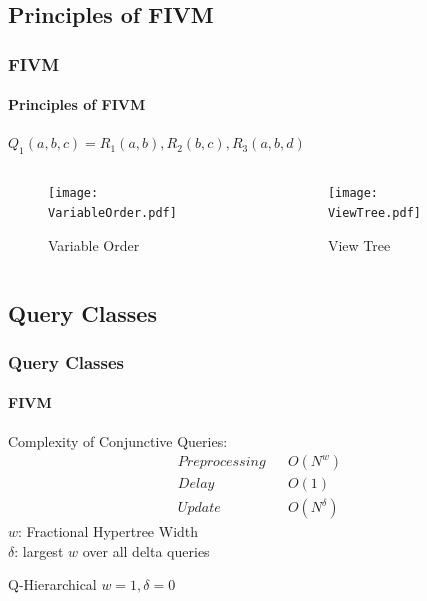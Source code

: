 \documentclass[
	11pt, %
]{beamer}
\begin{document}

\subsection{Principles  of FIVM}
\begin{frame}
		\frametitle{FIVM}
		\framesubtitle{Principles of FIVM}


		$Q_1(a, b, c) = R_1(a, b), R_2(b, c), R_3(a, b, d)$
		\begin{columns}[c] 
			\begin{column}{0.45\textwidth} 
				\begin{figure}
					\texttt{[image: VariableOrder.pdf]}
					\caption{Variable Order}
				\end{figure}
			\end{column}
			\begin{column}{0.45\textwidth} 
				\begin{figure}
					\texttt{[image: ViewTree.pdf]}
					\caption{View Tree}
				\end{figure}
			\end{column}
		\end{columns}

\end{frame}
\subsection{Query Classes}
\begin{frame}
	\frametitle{Query Classes}
	\framesubtitle{FIVM}
	Complexity of Conjunctive Queries:
	\begin{align*}
		Preprocessing & & O(N^w) \\
		Delay & & O(1) \\
		Update & & O(N^\delta)
	\end{align*}
	$w$: Fractional Hypertree Width\\
	$\delta$: largest $w$ over all delta queries
	\begin{block}{Q-Hierarchical}
		$w = 1, \delta=0$ 
	\end{block}
	
\end{frame}
\end{document}
